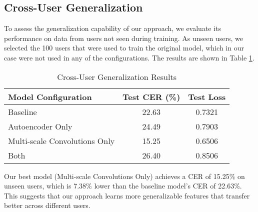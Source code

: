 \subsection{Cross-User Generalization}

To assess the generalization capability of our approach, we evaluate its performance on data from users not seen during training. As unseen users, we selected the 100 users that were used to train the original model, which in our case were not used in any of the configurations. The results are shown in Table \ref{tab:cross_user_generalization}.

\begin{table}[h]
    \centering
    \caption{Cross-User Generalization Results}
    \begin{tabular}{lcc}
        \hline
        \textbf{Model Configuration}  & \textbf{Test CER (\%)} & \textbf{Test Loss} \\
        \hline
        Baseline                      & 22.63                  & 0.7321             \\
        Autoencoder Only              & 24.49                  & 0.7903             \\
        Multi-scale Convolutions Only & 15.25                  & 0.6506             \\
        Both                          & 26.40                  & 0.8506             \\
        \hline
    \end{tabular}
    \label{tab:cross_user_generalization}
\end{table}

Our best model (Multi-scale Convolutions Only) achieves a CER of 15.25\% on unseen users, which is 7.38\% lower than the baseline model's CER of 22.63\%. This suggests that our approach learns more generalizable features that transfer better across different users.